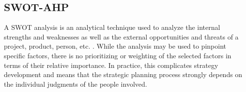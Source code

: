 



\subsection{SWOT-AHP}
A SWOT analysis is an analytical technique used to analyze the internal strengths and weaknesses as well as the external opportunities and threats of a project, product, person, etc. \cite{Kotler2016TheManagement}.
While the analysis may be used to pinpoint specific factors, there is no prioritizing or weighting of the selected factors in terms of their relative importance.
In practice, this complicates strategy development and means that the strategic planning process strongly depends on the individual judgments of the people involved. 

